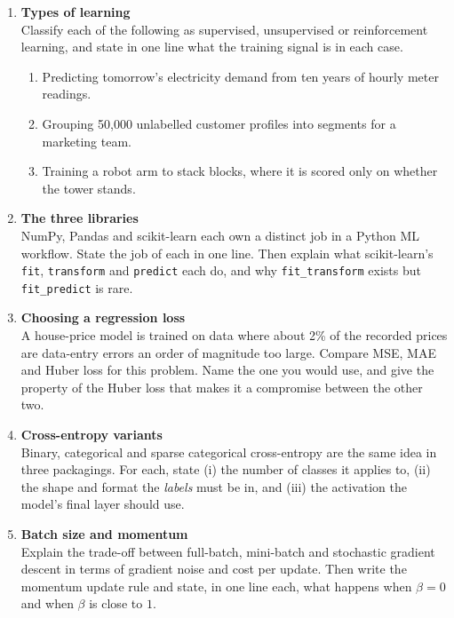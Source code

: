 \documentclass[11pt,a4paper]{article}
\begin{document}
\begin{enumerate}[label=\textbf{A\arabic*.}, leftmargin=*]

  \item \textbf{Types of learning} \\
    Classify each of the following as supervised, unsupervised or reinforcement
    learning, and state in one line what the training signal is in each case.
    \begin{enumerate}[label=(\alph*), leftmargin=*]
      \item Predicting tomorrow's electricity demand from ten years of hourly meter readings.
      \item Grouping 50{,}000 unlabelled customer profiles into segments for a marketing team.
      \item Training a robot arm to stack blocks, where it is scored only on whether the tower stands.
    \end{enumerate}

  \item \textbf{The three libraries} \\
    NumPy, Pandas and scikit-learn each own a distinct job in a Python ML
    workflow. State the job of each in one line. Then explain what
    scikit-learn's \texttt{fit}, \texttt{transform} and \texttt{predict} each do,
    and why \texttt{fit\_transform} exists but \texttt{fit\_predict} is rare.

  \item \textbf{Choosing a regression loss} \\
    A house-price model is trained on data where about 2\% of the recorded
    prices are data-entry errors an order of magnitude too large. Compare MSE,
    MAE and Huber loss for this problem. Name the one you would use, and give
    the property of the Huber loss that makes it a compromise between the other
    two.

  \item \textbf{Cross-entropy variants} \\
    Binary, categorical and sparse categorical cross-entropy are the same idea
    in three packagings. For each, state (i) the number of classes it applies
    to, (ii) the shape and format the \emph{labels} must be in, and (iii) the
    activation the model's final layer should use.

  \item \textbf{Batch size and momentum} \\
    Explain the trade-off between full-batch, mini-batch and stochastic
    gradient descent in terms of gradient noise and cost per update. Then write
    the momentum update rule and state, in one line each, what happens when
    $\beta = 0$ and when $\beta$ is close to $1$.


\end{enumerate}
\end{document}
